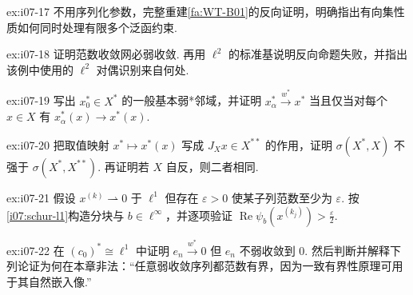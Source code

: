 \begin{FAExercise}[弱收敛的网判据]{ex:i07-17}
不用序列化参数，完整重建\autoref{fa:WT-B01}的反向证明，明确指出有向集性质如何同时处理有限多个泛函约束.
\end{FAExercise}

\begin{FAExercise}[范数收敛与弱收敛]{ex:i07-18}
证明范数收敛网必弱收敛. 再用 \(\displaystyle \ell^2\) 的标准基说明反向命题失败，并指出该例中使用的 \(\displaystyle \ell^2\) 对偶识别来自何处.
\end{FAExercise}

\begin{FAExercise}{ex:i07-19}
写出 \(\displaystyle x_0^*\in X^*\) 的一般基本弱*邻域，并证明 \(\displaystyle x_\alpha^*\overset{w^*}{\longrightarrow}x^*\) 当且仅当对每个 \(\displaystyle x\in X\) 有 \(\displaystyle x_\alpha^*(x)\to x^*(x)\).
\end{FAExercise}

\begin{FAExercise}[弱*与弱的比较]{ex:i07-20}
把取值映射 \(\displaystyle x^*\mapsto x^*(x)\) 写成 \(\displaystyle J_Xx\in X^{**}\) 的作用，证明 \(\displaystyle \sigma(X^*,X)\) 不强于 \(\displaystyle \sigma(X^*,X^{**})\). 再证明若 \(\displaystyle X\) 自反，则二者相同.
\end{FAExercise}

\begin{FAExercise}[Schur分块构造]{ex:i07-21}
假设 \(\displaystyle x^{(k)}\rightharpoonup0\) 于 \(\displaystyle \ell^1\) 但存在 \(\displaystyle \varepsilon>0\) 使某子列范数至少为 \(\displaystyle \varepsilon\). 按\autoref{i07:schur-l1}构造分块与 \(\displaystyle b\in\ell^\infty\)，并逐项验证 \(\displaystyle \operatorname{Re}\psi_b(x^{(k_j)})>\frac{\varepsilon}{2}\).
\end{FAExercise}

\begin{FAExercise}[弱*收敛不蕴含弱收敛的反例与禁止推断]{ex:i07-22}
在 \(\displaystyle (c_0)^*\cong\ell^1\) 中证明 \(\displaystyle e_n\overset{w^*}{\longrightarrow}0\) 但 \(\displaystyle e_n\) 不弱收敛到 \(\displaystyle0\). 然后判断并解释下列论证为何在本章非法：“任意弱收敛序列都范数有界，因为一致有界性原理可用于其自然嵌入像.”
\end{FAExercise}
